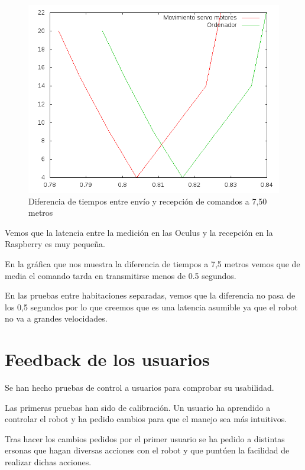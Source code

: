 \documentclass[twoside, 12pt]{epstfg}
\begin{document}
\begin{figure}[h!]
	\centerline{
		\mbox{\includegraphics[width=.80\textwidth]{images/Temp_fuera.png}}
	}
	\caption{Diferencia de tiempos entre envío y recepción de comandos a 7,50 metros}
\end{figure}

Vemos que la latencia entre la medición en las Oculus y la recepción en la Raspberry es muy pequeña.

En la gráfica que nos muestra la diferencia de tiempos a 7,5 metros vemos que de media el comando tarda en transmitirse menos de 0.5 segundos.

En las pruebas entre habitaciones separadas, vemos que la diferencia no pasa de los 0,5 segundos por lo que creemos que es una latencia asumible ya que el robot no va a grandes velocidades.
\newpage

\section{Feedback de los usuarios}

Se han hecho pruebas de control a usuarios para comprobar su usabilidad.

Las primeras pruebas han sido de calibración. Un usuario ha aprendido a controlar el robot y ha pedido cambios para que el manejo sea más intuitivos.

Tras hacer los cambios pedidos por el primer usuario se ha pedido a distintas ersonas que hagan diversas acciones con el robot y que puntúen la facilidad de realizar dichas acciones.
\end{document}
